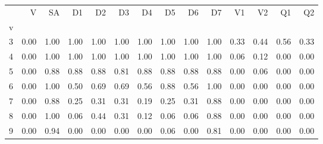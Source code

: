 \begin{tabular}{lrrrrrrrrrrrrr}
\toprule
{} &    V &   SA &   D1 &   D2 &   D3 &   D4 &   D5 &   D6 &   D7 &   V1 &   V2 &   Q1 &   Q2 \\
v &      &      &      &      &      &      &      &      &      &      &      &      &      \\
\midrule
3 & 0.00 & 1.00 & 1.00 & 1.00 & 1.00 & 1.00 & 1.00 & 1.00 & 1.00 & 0.33 & 0.44 & 0.56 & 0.33 \\
4 & 0.00 & 1.00 & 1.00 & 1.00 & 1.00 & 1.00 & 1.00 & 1.00 & 1.00 & 0.06 & 0.12 & 0.00 & 0.00 \\
5 & 0.00 & 0.88 & 0.88 & 0.88 & 0.81 & 0.88 & 0.88 & 0.88 & 0.88 & 0.00 & 0.06 & 0.00 & 0.00 \\
6 & 0.00 & 1.00 & 0.50 & 0.69 & 0.69 & 0.56 & 0.88 & 0.56 & 1.00 & 0.00 & 0.00 & 0.00 & 0.00 \\
7 & 0.00 & 0.88 & 0.25 & 0.31 & 0.31 & 0.19 & 0.25 & 0.31 & 0.88 & 0.00 & 0.00 & 0.00 & 0.00 \\
8 & 0.00 & 1.00 & 0.06 & 0.44 & 0.31 & 0.12 & 0.06 & 0.06 & 0.88 & 0.00 & 0.00 & 0.00 & 0.00 \\
9 & 0.00 & 0.94 & 0.00 & 0.00 & 0.00 & 0.00 & 0.06 & 0.00 & 0.81 & 0.00 & 0.00 & 0.00 & 0.00 \\
\bottomrule
\end{tabular}
